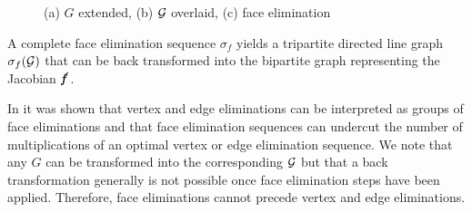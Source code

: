 \documentclass[acmtocl,acmnow]{acmtrans2m}
\newcommand{\bmf}{\mbox{\bf\em f}}
\begin{document}
\begin{figure}
\centering
{}
\caption{
(a) $G$ extended, 
(b) $\cal G$ overlaid, 
(c) face elimination 
}
\label{fig:face_elims}
\end{figure}

A complete face elimination sequence $\sigma_f$ yields a tripartite 
directed line graph $\sigma_f({\cal G})$ that can be back transformed into 
the bipartite graph representing the Jacobian $\bmf'$.

In \cite{ElimTechMP} it was shown that vertex and edge 
eliminations can be interpreted 
as groups of face eliminations and that face 
elimination sequences can undercut the number of multiplications of an 
optimal vertex or edge elimination sequence.  
We note that any $G$ can be transformed into the 
corresponding $\cal G$ but that a back transformation 
generally is not  possible once face elimination steps have been applied. 
Therefore, face eliminations cannot precede vertex and edge 
eliminations.
\end{document}
